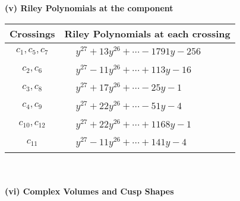 \documentclass[1p]{elsarticle_modified}
\theoremstyle{definition}
\begin{document}
\newpage\renewcommand{\arraystretch}{1}
\flushleft \textbf{(v) Riley Polynomials at the component}\newline \\
\begin{tabular}{m{50pt}|m{274pt}}
Crossings & \hspace{64pt}Riley Polynomials at each crossing \\
\hline $$\begin{aligned}c_{1},c_{5},c_{7}\end{aligned}$$&$\begin{aligned}
&y^{27}+13 y^{26}+\cdots-1791 y-256
\end{aligned}$\\
\hline $$\begin{aligned}c_{2},c_{6}\end{aligned}$$&$\begin{aligned}
&y^{27}-11 y^{26}+\cdots+113 y-16
\end{aligned}$\\
\hline $$\begin{aligned}c_{3},c_{8}\end{aligned}$$&$\begin{aligned}
&y^{27}+17 y^{26}+\cdots-25 y-1
\end{aligned}$\\
\hline $$\begin{aligned}c_{4},c_{9}\end{aligned}$$&$\begin{aligned}
&y^{27}+22 y^{26}+\cdots-51 y-4
\end{aligned}$\\
\hline $$\begin{aligned}c_{10},c_{12}\end{aligned}$$&$\begin{aligned}
&y^{27}+22 y^{26}+\cdots+1168 y-1
\end{aligned}$\\
\hline $$\begin{aligned}c_{11}\end{aligned}$$&$\begin{aligned}
&y^{27}-11 y^{26}+\cdots+141 y-4
\end{aligned}$\\
\hline
\end{tabular}\\~\\
\newpage\flushleft \textbf{(vi) Complex Volumes and Cusp Shapes}
\end{document}
